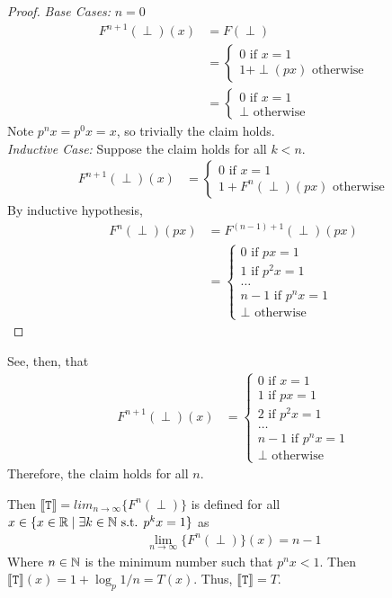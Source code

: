 \begin{proof}

\emph{Base Cases: } $n = 0$
\begin{align*}
F^{n+1}(\perp)(x) &= F(\perp) \\
&= 
\begin{cases}
0 \text{ if } x=1 \\
1 + \perp(px) \text{ otherwise}
\end{cases} \\
&=
\begin{cases}
0 \text{ if } x=1 \\
\perp \text{ otherwise}
\end{cases} 
\end{align*}
Note $p^{n}x = p^0x = x$, so trivially the claim holds. \\
\emph{Inductive Case: } Suppose the claim holds for all $k < n$.
\begin{align*}
F^{n+1}(\perp)(x) &=  
\begin{cases}
0 \text{ if } x=1 \\
1 + F^{n}(\perp)(px) \text{ otherwise}
\end{cases} 
\end{align*}
By inductive hypothesis,
\begin{align*}
F^{n}(\perp)(px) &= F^{(n-1) + 1}(\perp)(px) \\
&=  
 \begin{cases}
 0 \text{ if } px = 1 \\
 1 \text{ if } p^2x = 1  \\
 \dots \\
 n - 1 \text{ if }  p^{n}x =1  \\
 \perp \text{ otherwise}
 \end{cases}
 \end{align*}
\end{proof}
See, then, that
\begin{align*}
F^{n+1}(\perp)(x) &=  
\begin{cases}
0 \text{ if } x=1 \\
1 \text{ if } px = 1 \\
2 \text{ if } p^2x = 1  \\
\dots \\
n-1 \text{ if } p^{n}x = 1  \\
\perp \text{ otherwise } 
\end{cases}
\end{align*}
Therefore, the claim holds for all $n$.

Then $\llbracket \texttt{T} \rrbracket = lim_{n \to \infty}\{F^n (\perp)\}$ is defined for all $x \in \{x \in \mathbb{R} \mid \exists k \in \mathbb{N} \text{ s.t. } p^kx = 1\}$ as
\begin{align*}
\lim_{n \to \infty}\{F^n (\perp)\}(x) = n - 1
\end{align*}
Where $n \in \mathbb{N}$ is the minimum number such that $p^nx<1$. Then $\llbracket \texttt{T} \rrbracket(x) = 1 + \log_{p}1/n= T(x)$. Thus, $\llbracket \texttt{T} \rrbracket = T$.
 



